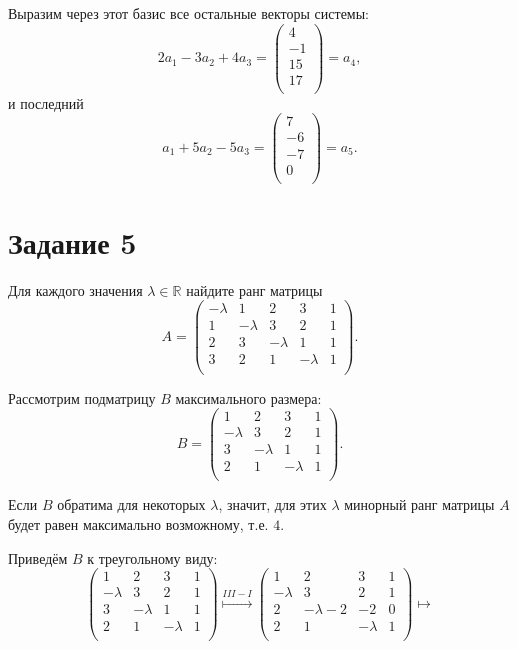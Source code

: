 \documentclass[a4paper,12pt]{article}
\begin{document}
Выразим через этот базис все остальные векторы системы:
$$2a_1-3a_2+4a_3=
\begin{pmatrix}
4 \\
-1 \\
15 \\
17 \\
\end{pmatrix}=a_4,$$
и последний
$$a_1+5a_2-5a_3=
\begin{pmatrix}
7 \\
-6 \\
-7 \\
0 \\
\end{pmatrix}=a_5.$$
\newpage
\section*{Задание 5}
Для каждого значения $\lambda\in \mathbb R$ найдите ранг матрицы
$$A=
\begin{pmatrix}
{-\lambda}&{1}&{2}&{3}&{1}\\
{1}&{-\lambda}&{3}&{2}&{1}\\
{2}&{3}&{-\lambda}&{1}&{1}\\
{3}&{2}&{1}&{-\lambda}&{1}\\
\end{pmatrix}.$$\par
{}\par
\noindent Рассмотрим подматрицу $B$ максимального размера:
$$B=
\begin{pmatrix}
{1}&{2}&{3}&1\\
{-\lambda}&{3}&{2}&1\\
{3}&{-\lambda}&{1}&1\\
{2}&{1}&{-\lambda}&1\\
\end{pmatrix}.$$ \par
Если $B$ обратима для некоторых $\lambda$, значит, для этих $\lambda$ минорный ранг матрицы $A$ будет равен максимально возможному, т.е. $4$.
\par
Приведём $B$ к треугольному виду:
$$
\begin{pmatrix}
{1}&{2}&{3}&1\\
{-\lambda}&{3}&{2}&1\\
{3}&{-\lambda}&{1}&1\\
{2}&{1}&{-\lambda}&1\\
\end{pmatrix}
\overset{III-I}{\longmapsto}
\begin{pmatrix}
{1}&{2}&{3}&1\\
{-\lambda}&{3}&{2}&1\\
{2}&{-\lambda-2}&{-2}&0\\
{2}&{1}&{-\lambda}&1\\
\end{pmatrix}
\longmapsto
$$
\end{document}
